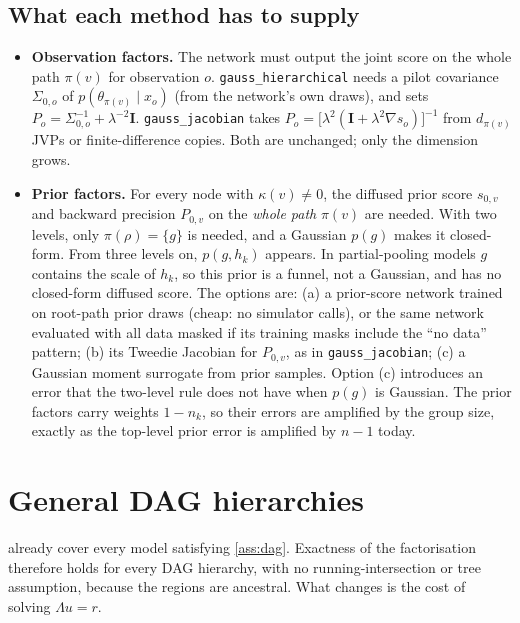 \documentclass[11pt]{article}
\theoremstyle{definition}
\theoremstyle{remark}
\newcommand{\I}{\mathbf{I}}
\newcommand{\lam}{\lambda}
\newcommand{\arrowm}{\texttt{gauss\_hierarchical}}
\newcommand{\quiver}{\texttt{gauss\_jacobian}}
\begin{document}
\subsection{What each method has to supply}
\begin{itemize}
\item \textbf{Observation factors.} The network must output the joint score on
 the whole path $\pi(v)$ for observation $o$. \arrowm{} needs a pilot covariance
 $\Sigma_{0,o}$ of $p(\theta_{\pi(v)}\mid x_o)$ (from the network's own draws), and
 sets $P_o=\Sigma_{0,o}^{-1}+\lam^{-2}\I$. \quiver{} takes
 $P_o=\big[\lam^2(\I+\lam^2\nabla s_o)\big]^{-1}$ from $d_{\pi(v)}$ JVPs or
 finite-difference copies. Both are unchanged; only the dimension grows.
\item \textbf{Prior factors.} For every node with $\kappa(v)\neq0$, the diffused
 prior score $s_{0,v}$ and backward precision $P_{0,v}$ on the \emph{whole path}
 $\pi(v)$ are needed. With two levels, only $\pi(\rho)=\{g\}$ is needed, and
 a Gaussian $p(g)$ makes it closed-form. From three levels on, $p(g,h_k)$
 appears. In partial-pooling models $g$ contains the scale of $h_k$, so this
 prior is a funnel, not a Gaussian, and has no closed-form diffused score. The
 options are: (a) a prior-score network trained on root-path prior draws
 (cheap: no simulator calls), or the same network evaluated with all data
 masked if its training masks include the ``no data'' pattern; (b) its Tweedie
 Jacobian for $P_{0,v}$, as in \quiver; (c) a Gaussian moment surrogate from
 prior samples. Option (c) introduces an error that the two-level rule does not
 have when $p(g)$ is Gaussian. The prior factors carry weights $1-n_k$, so their
 errors are amplified by the group size, exactly as the top-level prior error
 is amplified by $n-1$ today.
\end{itemize}

\section{General DAG hierarchies}\label{sec:dag}

 already cover every model satisfying
\cref{ass:dag}. Exactness of the factorisation therefore holds for every DAG
hierarchy, with no running-intersection or tree assumption, because the regions
are ancestral. What changes is the cost of solving $\Lambda u=r$.
\end{document}
